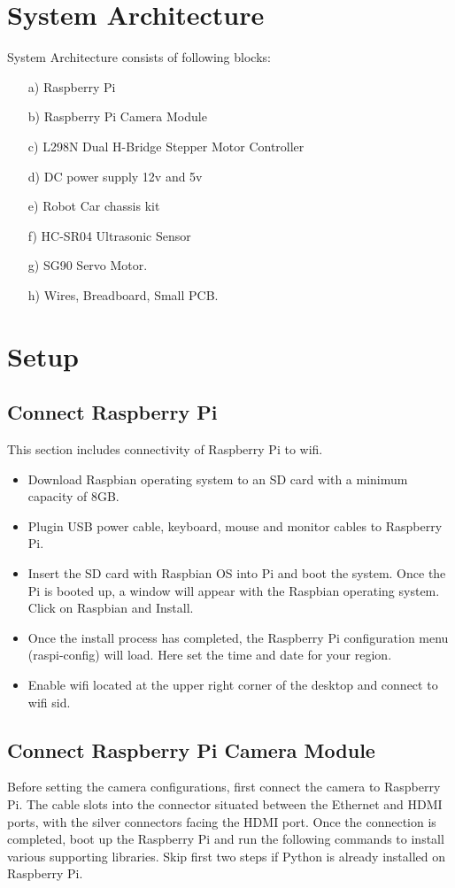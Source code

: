 \documentclass[sigconf]{acmart}
\begin{document}
\section{System Architecture}
System Architecture consists of following blocks:

\begin{itemize}
\item[a)] Raspberry Pi
\item[b)] Raspberry Pi Camera Module
\item[c)] L298N Dual H-Bridge Stepper Motor Controller
\item[d)] DC power supply 12v and 5v
\item[e)] Robot Car chassis kit
\item[f)] HC-SR04 Ultrasonic Sensor
\item[g)] SG90 Servo Motor.
\item[h)] Wires, Breadboard, Small PCB.
\end{itemize}


\section{Setup}
\subsection{Connect Raspberry Pi}
This section includes connectivity of Raspberry Pi to wifi. 

\begin{itemize}
\item Download Raspbian operating system to an SD card with a minimum capacity of 8GB.
\item Plugin USB power cable, keyboard, mouse and monitor cables to Raspberry Pi.
\item Insert the SD card with Raspbian OS into Pi and boot the system. Once the Pi is booted up, a window will appear with the Raspbian operating system. Click on Raspbian and Install.
\item Once the install process has completed, the Raspberry Pi configuration menu (raspi-config) will load. Here set the time and date for your region.
\item Enable wifi located at the upper right corner of the desktop and connect to wifi sid.
\end{itemize}


\subsection{Connect Raspberry Pi Camera Module}
Before setting the camera configurations, first connect the camera to Raspberry Pi. The cable slots into the connector situated between the Ethernet and HDMI ports, with the silver connectors facing the HDMI port. Once the connection is completed, boot up the Raspberry Pi and run the following commands to install various supporting libraries. Skip first two steps if Python is already installed on Raspberry Pi.
\end{document}
